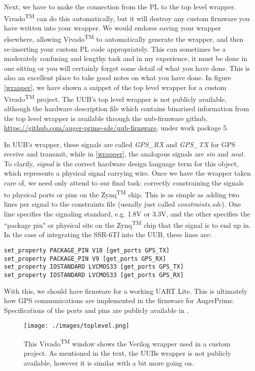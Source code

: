 Next, we have to make the connection from the PL to the top level wrapper. Vivado\textsuperscript{TM} can do this automatically, but it will destroy any custom firmware you have written into your wrapper. We would endorse saving your wrapper elsewhere, allowing Vivado\textsuperscript{TM} to automatically generate the wrapper, and then re-inserting your custom PL code appropriately. This can sometimes be a moderately confusing and lengthy task and in my experience, it must be done in one sitting or you will certainly forget some detail of what you have done. This is also an excellent place to take good notes on what you have done. In figure \autoref{wrapper}, we have shown a snippet of the top level wrapper for a custom Vivado\textsuperscript{TM} project. The UUB's top level wrapper is not publicly available, although the hardware description file which contains binarized information from the top level wrapper is available through the uub-firmware github, \url{https://github.com/auger-prime-sde/uub-firmware}, under work package 5.

In UUB's wrapper, these signals are called \textit{GPS\_RX} and \textit{GPS\_TX} for GPS receive and transmit, while in \autoref{wrapper}, the analogous signals are \textit{sin} and \textit{sout}. To clarify, \textit{signal} is the correct hardware design language term for this object, which represents a physical signal carrying wire. Once we have the wrapper taken care of, we need only attend to our final task: correctly constraining the signals to physical ports or pins on the Zynq\textsuperscript{TM} chip. This is as simple as adding two lines per signal to the constraints file (usually just called \textit{constraints.xdc}). One line specifies the signaling standard, e.g. 1.8V or 3.3V, and the other specifies the ``package pin" or physical site on the Zynq\textsuperscript{TM} chip that the signal is to end up in. In the case of integrating the SSR-6Tf into the UUB, these lines are:
\begin{verbatim}
set_property PACKAGE_PIN V10 [get_ports GPS_TX]
set_property PACKAGE_PIN V9 [get_ports GPS_RX]
set_property IOSTANDARD LVCMOS33 [get_ports GPS_TX]
set_property IOSTANDARD LVCMOS33 [get_ports GPS_RX]
\end{verbatim}
With this, we should have firmware for a working UART Lite. This is ultimately how GPS communications are implemented in the firmware for AugerPrime. Specifications of the ports and pins are publicly available in \textcite{uubconst}.%
\begin{figure}[h!]
\centering
\texttt{[image: ./images/toplevel.png]}
\caption[Top Level Wrapper Example]{This Vivado\textsuperscript{TM} window shows the Verilog wrapper used in a custom project. As mentioned in the text, the UUBs wrapper is not publicly available, however it is similar with a bit more going on. }
\label{wrapper}
\end{figure}
